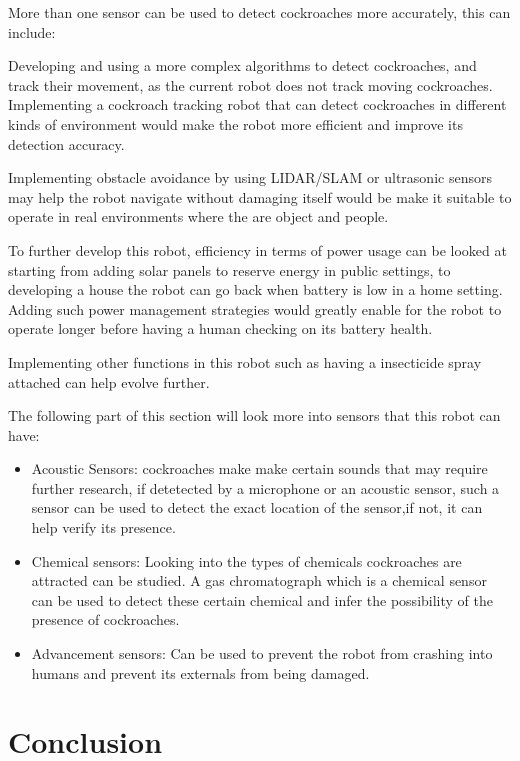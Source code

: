 \documentclass[11pt]{article}
\begin{document}
	
	More than one sensor can be used to detect cockroaches more accurately, this can include:
	
Developing and using a more complex algorithms to detect cockroaches, and track their movement, as the current robot does not track moving cockroaches. Implementing a cockroach tracking robot that can detect cockroaches in different kinds of environment  would make the robot more efficient and improve its detection accuracy.

Implementing obstacle avoidance by using LIDAR/SLAM or ultrasonic sensors may help the robot navigate without damaging itself would be make it suitable to operate in real environments where the are object and people. 

To further develop this robot, efficiency in terms of power usage can be looked at starting from adding solar panels to reserve energy in public settings, to developing a house the robot can go back when battery is low in a home setting. Adding such power management strategies would greatly enable for the robot to operate longer before having a human checking on its battery health.

Implementing other functions in this robot such as having a insecticide spray attached can help evolve further.

The following part of this section will look more into sensors that this robot can have:
\begin{itemize}
	\item Acoustic Sensors: cockroaches make make certain sounds that may require further research, if detetected by a microphone or an acoustic sensor, such a sensor can be used to detect the exact location of the sensor,if not, it can help verify its presence.

	\item Chemical sensors: Looking into the types of chemicals cockroaches are attracted can be studied. A gas chromatograph which is a chemical sensor can be used to detect these certain chemical and infer the possibility of the presence of cockroaches.
	\item Advancement sensors: Can be used to prevent the robot from crashing into humans and prevent its externals from being damaged.
	
\end{itemize}

	
	\section{Conclusion}
\end{document}
